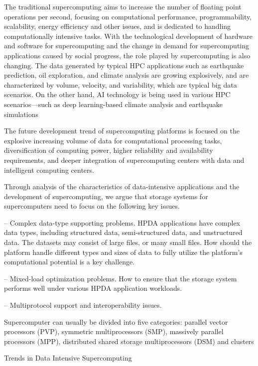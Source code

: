 \documentclass[a4paper,twoside]{scrbook}
\begin{document}
The traditional supercomputing aims to increase the number of floating point operations per second, focusing on computational performance, programmability, scalability, energy efficiency and other issues, and is dedicated to handling computationally intensive tasks.
With the technological development of hardware and software for supercomputing and the change in demand for supercomputing applications caused by social progress, the role played by supercomputing is also changing. The data generated by typical HPC applications such as earthquake prediction, oil exploration, and climate analysis are growing explosively, and are characterized by volume, velocity, and variability, which are typical big data scenarios. On the other hand, AI technology is being used in various HPC scenarios—such as deep learning-based climate analysis and earthquake simulations

The future development trend of supercomputing platforms is focused on the explosive increasing volume of data for computational processing tasks, diversification of computing power, higher reliability and availability requirements, and deeper integration of supercomputing centers with data and intelligent computing centers.

Through analysis of the characteristics of data-intensive applications and the development of supercomputing, we argue that storage systems for supercomputers need to focus on the following key issues.

– Complex data-type supporting problems. HPDA applications have complex data types, including structured data, semi-structured data, and unstructured data. The datasets may consist of large files, or many small files. How should the platform handle different types and sizes of data to fully utilize the platform’s computational potential is a key challenge.

– Mixed-load optimization problems. How to ensure that the storage system performs well under various HPDA application workloads.

– Multiprotocol support and interoperability issues.

Supercomputer can usually be divided into five categories: parallel vector processors (PVP), symmetric multiprocessors (SMP), massively parallel processors (MPP), distributed shared storage multiprocessors (DSM) and clusters

Trends in Data Intensive Supercomputing
\end{document}
